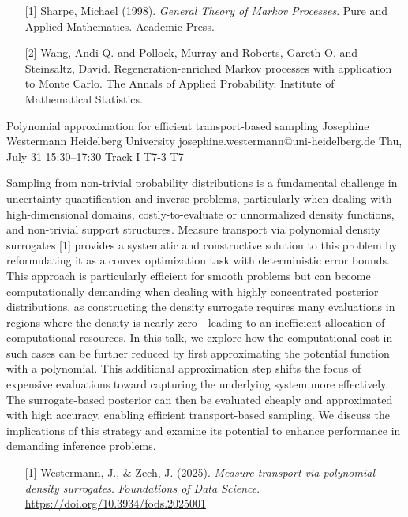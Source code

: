 \begin{talk}
\medskip

\begin{enumerate}
	\item[{[1]}] Sharpe, Michael (1998). {\it General Theory of Markov Processes}. Pure and Applied Mathematics. Academic Press.
	\item[{[2]}] Wang, Andi Q. and Pollock, Murray and Roberts, Gareth O. and Steinsaltz, David. Regeneration-enriched Markov processes with application to Monte Carlo. The Annals of Applied Probability. Institute of Mathematical Statistics.
\end{enumerate}

\end{talk}
\begin{talk}
  {Polynomial approximation for efficient transport-based sampling}%
  {Josephine Westermann}%
  {Heidelberg University}%
  {josephine.westermann@uni-heidelberg.de}%
  {}%
  {}%
  {Thu, July 31 15:30–17:30 Track I}%
  {T7-3}%
  {T7}%
  {}

Sampling from non-trivial probability distributions is a fundamental challenge in uncertainty quantification and inverse problems, particularly when dealing with high-dimensional domains, costly-to-evaluate or unnormalized density functions, and non-trivial support structures. Measure transport via polynomial density surrogates [1] provides a systematic and constructive solution to this problem by reformulating it as a convex optimization task with deterministic error bounds. This approach is particularly efficient for smooth problems but can become computationally demanding when dealing with highly concentrated posterior distributions, as constructing the density surrogate requires many evaluations in regions where the density is nearly zero—leading to an inefficient allocation of computational resources. In this talk, we explore how the computational cost in such cases can be further reduced by first approximating the potential function with a polynomial. This additional approximation step shifts the focus of expensive evaluations toward capturing the underlying system more effectively. The surrogate-based posterior can then be evaluated cheaply and approximated with high accuracy, enabling efficient transport-based sampling. We discuss the implications of this strategy and examine its potential to enhance performance in demanding inference problems.

\medskip

\begin{enumerate}
	\item[{[1]}] Westermann, J., \& Zech, J. (2025). \textit{Measure transport via polynomial density surrogates}. \textit{Foundations of Data Science}. \url{https://doi.org/10.3934/fods.2025001}
\end{enumerate}

\end{talk}
